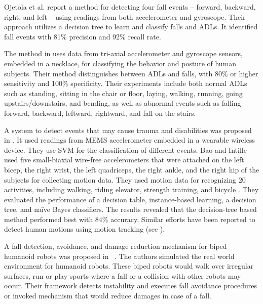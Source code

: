 \documentclass[]{IEEEtran}
\begin{document}
\par Ojetola et al. \cite{ojetolaFallDetection2011} report a method for detecting
four fall events -- forward, backward, right, and left -- using readings from both 
accelerometer and gyroscope. Their approach utilizes a decision tree to learn
and classify falls and ADLs. It identified fall events with 81\% precision and
92\% recall rate. 

The method  in\cite{baekFallDetection2013} uses  data from tri-axial
accelerometer  and  gyroscope  sensors, embedded in a necklace, for classifying
the  behavior  and  posture  of  human subjects. Their method distinguishes
between ADLs and  falls, with 80\%  or higher sensitivity  and  100\%
specificity. Their experiments include both normal ADLs such as standing,
sitting in the chair or floor, laying, walking, running, going
upstairs/downstairs, and bending, as well as abnormal events such as falling
forward, backward, leftward, rightward, and fall on the stairs. 
 
A system  to detect  events that may cause trauma and disabilities  was
proposed in \cite{leoneFallDetection2013}. It used readings from MEMS
accelerometer embedded in a wearable wireless device. They use SVM for
the classification of different events. Bao and Intille 
\cite{BaoActivityrecognition2004} used five small-biaxial wire-free accelerometers
that were attached  on the left bicep, the right wrist, the left quadriceps, the
right ankle, and the right hip  of the subjects for collecting motion data. They used motion data for 
recognizing 20 activities, including walking, riding elevator, strength training, and
bicycle . They evaluated the performance of a decision table,
instance-based learning, a decision tree, and na\"{i}ve Bayes classifiers. The results
revealed that the decision-tree based method performed best with 84\%
accuracy.  Similar efforts have been reported to detect human motions using
motion tracking (see
\cite{dumitracheFallDetection2013,kumarActivitAndFallDetection2013,krishnanActivityRecognition2014,gaoActivityRecognition2014,alvarezActivityAndFallRecognotion2015}).
 

A fall detection, avoidance, and damage reduction mechanism for biped humanoid
robots was proposed in {~\cite{Moya2015}}.  The authors
simulated the real world environment for humanoid robots. These biped robots would
walk over irregular surfaces, run or play sports where a fall or a collision with
other robots may occur. Their framework detects instability and executes fall
avoidance  procedures or invoked mechanism that would reduce damages in case
of a fall. %
\end{document}

